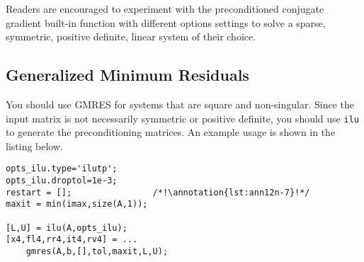 Readers are encouraged to experiment with the preconditioned conjugate gradient built-in function with different options settings to solve a sparse, symmetric, positive definite, linear system of their choice.

\subsection{Generalized Minimum Residuals}
You should use GMRES for systems that are square and non-singular.  Since the input matrix is not necessarily symmetric or positive definite, you should use \lstinline[style=myMatlab]{ilu} to generate the preconditioning matrices.  An example usage is shown in the listing below.
\begin{lstlisting}[style=myMatlab]
%% GMRES with Incomplete LU Preconditioner
opts_ilu.type='ilutp';
opts_ilu.droptol=1e-3;
restart = [];                /*!\annotation{lst:ann12n-7}!*/
maxit = min(imax,size(A,1));

[L,U] = ilu(A,opts_ilu); 
[x4,fl4,rr4,it4,rv4] = ...
    gmres(A,b,[],tol,maxit,L,U);
\end{lstlisting}
